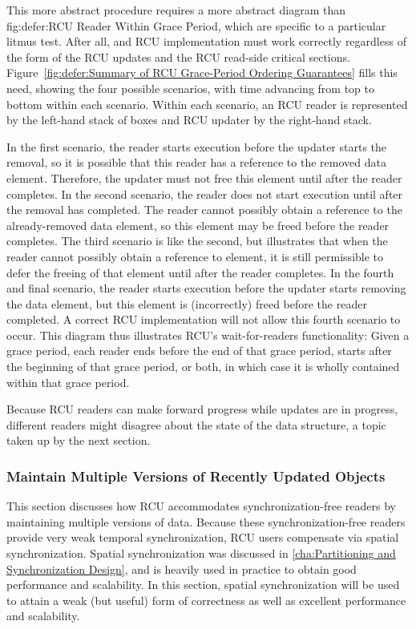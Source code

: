 This more abstract procedure requires a more abstract diagram than
{fig:defer:RCU Reader Within Grace Period},
which are specific to a particular litmus test.
After all, and RCU implementation must work correctly regardless of
the form of the RCU updates and the RCU read-side critical sections.
Figure~\ref{fig:defer:Summary of RCU Grace-Period Ordering Guarantees}
fills this need, showing the four possible scenarios, with time
advancing from top to bottom within each scenario.
Within each scenario, an RCU reader is represented by the left-hand
stack of boxes and RCU updater by the right-hand stack.

In the first scenario, the reader starts execution before the
updater starts the removal, so it is possible that this reader
has a reference to the removed data element.
Therefore, the updater must not free this element until after the
reader completes.
In the second scenario, the reader does not start execution until
after the removal has completed.
The reader cannot possibly obtain a reference to the already-removed
data element, so this element may be freed before the reader completes.
The third scenario is like the second, but illustrates that when the
reader cannot possibly obtain a reference to element, it is still
permissible to defer the freeing of that element until after the
reader completes.
In the fourth and final scenario, the reader starts execution before
the updater starts removing the data element, but this element
is (incorrectly) freed before the reader completed.
A correct RCU implementation will not allow this fourth scenario to
occur.
This diagram thus illustrates RCU's wait-for-readers functionality:
Given a grace period, each reader ends before the end of that grace
period, starts after the beginning of that grace period, or both, in
which case it is wholly contained within that grace period.

Because RCU readers can make forward progress while updates
are in progress, different readers might disagree about the state
of the data structure, a topic taken up by the next section.

\subsubsection{Maintain Multiple Versions of Recently Updated Objects}
\label{sec:defer:Maintain Multiple Versions of Recently Updated Objects}

This section discusses how RCU accommodates synchronization-free readers
by maintaining multiple versions of data.
Because these synchronization-free readers provide very weak temporal
synchronization, RCU users compensate via spatial synchronization.
Spatial synchronization was discussed in
\cref{cha:Partitioning and Synchronization Design}, and is heavily used
in practice to obtain good performance and scalability.
In this section, spatial synchronization will be used to attain a weak
(but useful) form of correctness as well as excellent performance and
scalability.

